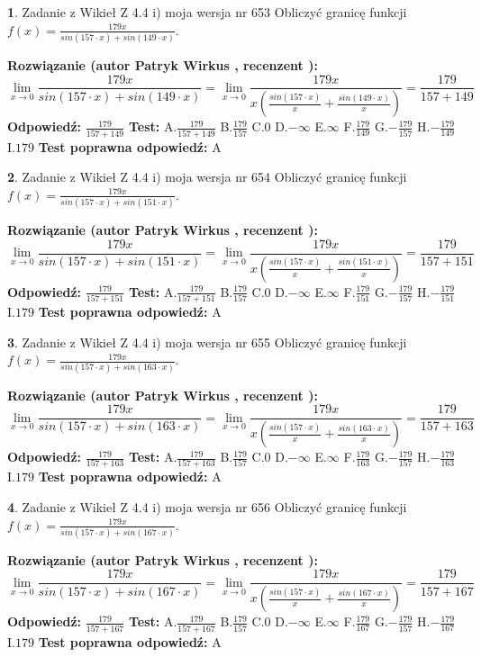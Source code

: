 \documentclass[12pt, a4paper]{article}
\theoremstyle{definition} %
\newtheorem{zad}{}
\newcommand{\zadStart}[1]{\begin{zad}#1\newline}
\newcommand{\zadStop}{\end{zad}}
\newcommand{\rozwStart}[2]{\noindent \textbf{Rozwiązanie (autor #1 , recenzent #2): }\newline}
\newcommand{\rozwStop}{\newline}
\newcommand{\odpStart}{\noindent \textbf{Odpowiedź:}\newline}
\newcommand{\odpStop}{\newline}
\newcommand{\testStart}{\noindent \textbf{Test:}\newline}
\newcommand{\testStop}{\newline}
\newcommand{\kluczStart}{\noindent \textbf{Test poprawna odpowiedź:}\newline}
\newcommand{\kluczStop}{\newline}
\begin{document}
\zadStart{Zadanie z Wikieł Z 4.4 i) moja wersja nr 653}
Obliczyć granicę funkcji $f(x)=\frac{179x}{sin(157\cdot x) +sin(149\cdot x)}$.
\zadStop
\rozwStart{Patryk Wirkus}{}
$$\lim\limits_{x\to 0}\frac{179x}{sin(157\cdot x) +sin(149\cdot x)}=\lim\limits_{x\to 0}\frac{179x}{x(\frac{sin(157\cdot x)}{x}+\frac{sin(149\cdot x)}{x})}=\frac{179}{157+149}$$
\rozwStop
\odpStart
$\frac{179}{157+149}$
\odpStop
\testStart
A.$\frac{179}{157+149}$
B.$\frac{179}{157}$
C.$0$
D.$-\infty$
E.$\infty$
F.$\frac{179}{149}$
G.$-\frac{179}{157}$
H.$-\frac{179}{149}$
I.$179$
\testStop
\kluczStart
A
\kluczStop



\zadStart{Zadanie z Wikieł Z 4.4 i) moja wersja nr 654}
Obliczyć granicę funkcji $f(x)=\frac{179x}{sin(157\cdot x) +sin(151\cdot x)}$.
\zadStop
\rozwStart{Patryk Wirkus}{}
$$\lim\limits_{x\to 0}\frac{179x}{sin(157\cdot x) +sin(151\cdot x)}=\lim\limits_{x\to 0}\frac{179x}{x(\frac{sin(157\cdot x)}{x}+\frac{sin(151\cdot x)}{x})}=\frac{179}{157+151}$$
\rozwStop
\odpStart
$\frac{179}{157+151}$
\odpStop
\testStart
A.$\frac{179}{157+151}$
B.$\frac{179}{157}$
C.$0$
D.$-\infty$
E.$\infty$
F.$\frac{179}{151}$
G.$-\frac{179}{157}$
H.$-\frac{179}{151}$
I.$179$
\testStop
\kluczStart
A
\kluczStop



\zadStart{Zadanie z Wikieł Z 4.4 i) moja wersja nr 655}
Obliczyć granicę funkcji $f(x)=\frac{179x}{sin(157\cdot x) +sin(163\cdot x)}$.
\zadStop
\rozwStart{Patryk Wirkus}{}
$$\lim\limits_{x\to 0}\frac{179x}{sin(157\cdot x) +sin(163\cdot x)}=\lim\limits_{x\to 0}\frac{179x}{x(\frac{sin(157\cdot x)}{x}+\frac{sin(163\cdot x)}{x})}=\frac{179}{157+163}$$
\rozwStop
\odpStart
$\frac{179}{157+163}$
\odpStop
\testStart
A.$\frac{179}{157+163}$
B.$\frac{179}{157}$
C.$0$
D.$-\infty$
E.$\infty$
F.$\frac{179}{163}$
G.$-\frac{179}{157}$
H.$-\frac{179}{163}$
I.$179$
\testStop
\kluczStart
A
\kluczStop



\zadStart{Zadanie z Wikieł Z 4.4 i) moja wersja nr 656}
Obliczyć granicę funkcji $f(x)=\frac{179x}{sin(157\cdot x) +sin(167\cdot x)}$.
\zadStop
\rozwStart{Patryk Wirkus}{}
$$\lim\limits_{x\to 0}\frac{179x}{sin(157\cdot x) +sin(167\cdot x)}=\lim\limits_{x\to 0}\frac{179x}{x(\frac{sin(157\cdot x)}{x}+\frac{sin(167\cdot x)}{x})}=\frac{179}{157+167}$$
\rozwStop
\odpStart
$\frac{179}{157+167}$
\odpStop
\testStart
A.$\frac{179}{157+167}$
B.$\frac{179}{157}$
C.$0$
D.$-\infty$
E.$\infty$
F.$\frac{179}{167}$
G.$-\frac{179}{157}$
H.$-\frac{179}{167}$
I.$179$
\testStop
\kluczStart
A
\kluczStop
\end{document}
